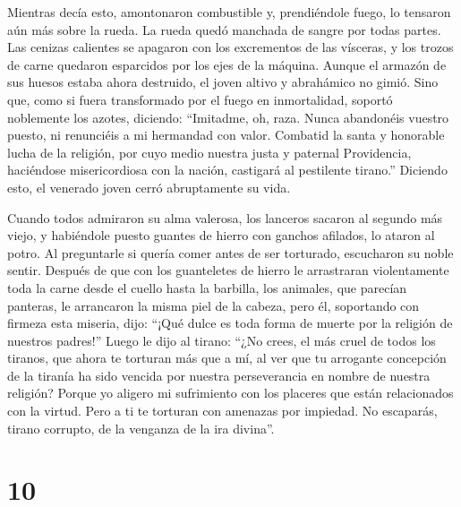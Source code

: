  Mientras decía esto, amontonaron combustible y,
prendiéndole fuego, lo tensaron aún más sobre la rueda. 
La rueda quedó manchada de sangre por todas partes. Las cenizas
calientes se apagaron con los excrementos de las vísceras, y los trozos
de carne quedaron esparcidos por los ejes de la máquina. 
Aunque el armazón de sus huesos estaba ahora destruido, el joven altivo
y abrahámico no gimió.  Sino que, como si fuera
transformado por el fuego en inmortalidad, soportó noblemente los
azotes, diciendo:  ``Imitadme, oh, raza. Nunca abandonéis
vuestro puesto, ni renunciéis a mi hermandad con valor. Combatid la
santa y honorable lucha de la religión,  por cuyo medio
nuestra justa y paternal Providencia, haciéndose misericordiosa con la
nación, castigará al pestilente tirano.''  Diciendo esto,
el venerado joven cerró abruptamente su vida.

 Cuando todos admiraron su alma valerosa, los lanceros
sacaron al segundo más viejo, y habiéndole puesto guantes de hierro con
ganchos afilados, lo ataron al potro.  Al preguntarle si
quería comer antes de ser torturado, escucharon su noble sentir.
 Después de que con los guanteletes de hierro le
arrastraran violentamente toda la carne desde el cuello hasta la
barbilla, los animales, que parecían panteras, le arrancaron la misma
piel de la cabeza, pero él, soportando con firmeza esta miseria, dijo:
 ``¡Qué dulce es toda forma de muerte por la religión de
nuestros padres!'' Luego le dijo al tirano:  ``¿No crees,
el más cruel de todos los tiranos, que ahora te torturan más que a mí,
al ver que tu arrogante concepción de la tiranía ha sido vencida por
nuestra perseverancia en nombre de nuestra religión? 
Porque yo aligero mi sufrimiento con los placeres que están relacionados
con la virtud.  Pero a ti te torturan con amenazas por
impiedad. No escaparás, tirano corrupto, de la venganza de la ira
divina''.

\hypertarget{section-9}{%
\section{10}\label{section-9}}

